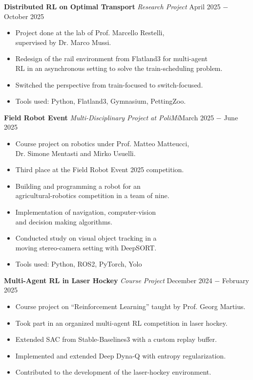 \documentclass{article}
\begin{document}
\noindent \textbf{Distributed RL on Optimal Transport} \textit{Research Project} \href{https://github.com/RobinU434/SwitchFL}{\faGithubSquare} \hfill April 2025 $-$ October 2025
\begin{itemize}[noitemsep,nolistsep,leftmargin=*]
    \item Project done at the lab of Prof. Marcello Restelli, \\
    supervised by Dr. Marco Mussi.
    \item Redesign of the rail environment from Flatland3 for multi-agent \\
    RL in an asynchronous setting to solve the train-scheduling problem.
    \item Switched the perspective from train-focused to switch-focused.
    \item Tools used: Python, Flatland3, Gymnasium, PettingZoo.\\
\end{itemize}

\noindent \textbf{Field Robot Event} \textit{Multi-Disciplinary Project at PoliMi}\hfill March 2025 $-$ June 2025
\begin{itemize}[noitemsep,nolistsep,leftmargin=*]
    \item Course project on robotics under Prof. Matteo Matteucci, \\
    Dr. Simone Mentasti and Mirko Usuelli.
    \item Third place at the Field Robot Event 2025 competition.
    \item Building and programming a robot for an \\
    agricultural-robotics competition in a team of nine.
    \item Implementation of navigation, computer-vision \\ 
    and decision making algorithms.
    \item Conducted study on visual object tracking in a \\
    moving stereo-camera setting with DeepSORT. 
    \item Tools used: Python, ROS2, PyTorch, Yolo\\
\end{itemize}

\noindent \textbf{Multi-Agent RL in Laser Hockey} \textit{Course Project} \href{https://github.com/RobinU434/LaserHockeyProject}{\faGithubSquare} \hfill December 2024 $-$ February 2025
\begin{itemize}[noitemsep,nolistsep,leftmargin=*]
    \item Course project on ``Reinforcement Learning'' taught by Prof. Georg Martius.
    \item Took part in an organized multi-agent RL competition in laser hockey.
    \item Extended SAC from Stable-Baselines3 with a custom replay buffer.
    \item Implemented and extended Deep Dyna-Q with entropy regularization.
    \item Contributed to the development of the laser-hockey environment.\\
\end{itemize}
\end{document}
